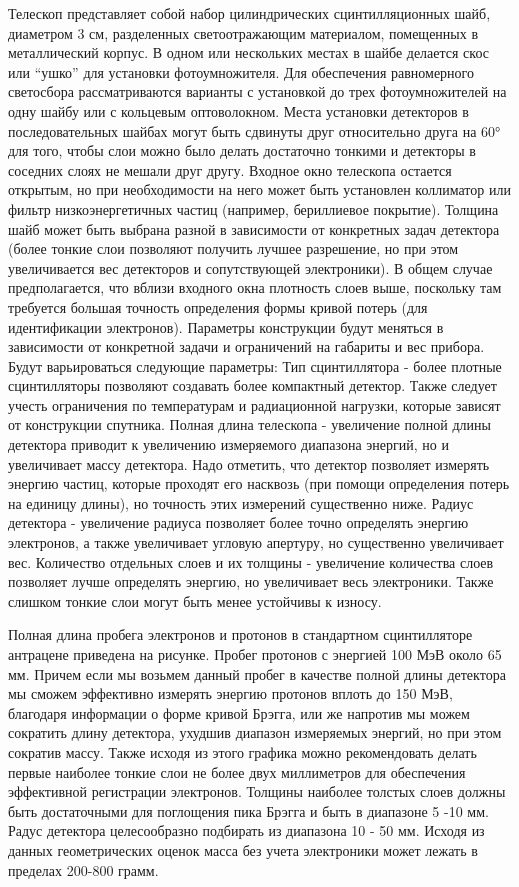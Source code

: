 Телескоп представляет собой набор цилиндрических сцинтилляционных шайб, диаметром 3 см, разделенных светоотражающим материалом, помещенных в металлический корпус. В одном или нескольких местах в шайбе делается скос или “ушко” для установки фотоумножителя. Для обеспечения равномерного светосбора рассматриваются варианты с установкой до трех фотоумножителей на одну шайбу или с кольцевым оптоволокном. Места установки детекторов в последовательных шайбах могут быть сдвинуты друг относительно друга на 60° для того, чтобы слои можно было делать достаточно тонкими и детекторы в соседних слоях не мешали друг другу. Входное окно телескопа остается открытым, но при необходимости на него может быть установлен коллиматор или фильтр низкоэнергетичных частиц (например, бериллиевое покрытие). Толщина шайб может быть выбрана разной в зависимости от конкретных задач детектора (более тонкие слои позволяют получить лучшее разрешение, но при этом увеличивается вес детекторов и сопутствующей электроники). В общем случае предполагается, что вблизи входного окна плотность слоев выше, поскольку там требуется большая точность определения формы кривой потерь (для идентификации электронов).
Параметры конструкции будут меняться в зависимости от конкретной задачи и ограничений на габариты и вес прибора. Будут варьироваться следующие параметры:
Тип сцинтиллятора - более плотные сцинтилляторы позволяют создавать более компактный детектор. Также следует учесть ограничения по температурам и радиационной нагрузки, которые зависят от конструкции спутника.
Полная длина телескопа - увеличение полной длины детектора приводит к увеличению измеряемого диапазона энергий, но и увеличивает массу детектора. Надо отметить, что детектор позволяет измерять энергию частиц, которые проходят его насквозь (при помощи определения потерь на единицу длины), но точность этих измерений существенно ниже.
Радиус детектора - увеличение радиуса позволяет более точно определять энергию электронов, а также увеличивает угловую апертуру, но существенно увеличивает вес. 
Количество отдельных слоев и их толщины - увеличение количества слоев позволяет лучше определять энергию, но увеличивает весь электроники. Также слишком тонкие слои могут быть менее устойчивы к износу.

Полная длина пробега электронов и протонов в стандартном сцинтилляторе антрацене приведена на рисунке. Пробег протонов с энергией 100 МэВ около 65 мм. Причем если мы возьмем данный пробег в качестве полной длины детектора мы сможем эффективно измерять энергию протонов вплоть до 150 МэВ,  благодаря информации о форме кривой Брэгга, или же напротив мы можем сократить длину детектора, ухудшив диапазон измеряемых энергий, но при этом сократив массу. Также исходя из этого графика можно рекомендовать делать первые наиболее тонкие слои не более двух миллиметров для обеспечения эффективной регистрации электронов. Толщины наиболее толстых слоев должны быть достаточными для поглощения пика Брэгга и быть в диапазоне 5 -10 мм. Радус детектора целесообразно подбирать из диапазона 10 - 50 мм. Исходя из данных геометрических оценок масса без учета электроники может лежать в пределах 200-800 грамм.


